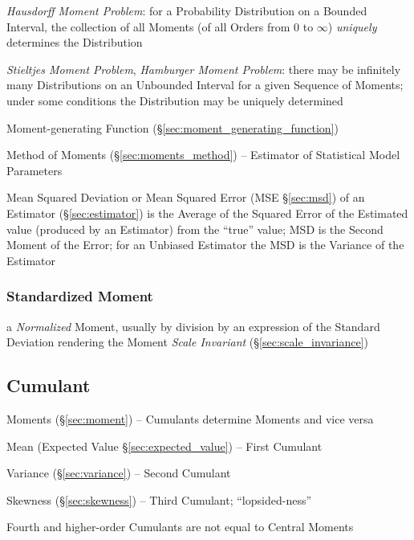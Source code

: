 \emph{Hausdorff Moment Problem}: for a Probability Distribution on a Bounded
Interval, the collection of all Moments (of all Orders from $0$ to $\infty$)
\emph{uniquely} determines the Distribution

\emph{Stieltjes Moment Problem}, \emph{Hamburger Moment Problem}: there may be
infinitely many Distributions on an Unbounded Interval for a given Sequence of
Moments; under some conditions the Distribution may be uniquely determined

\fist Moment-generating Function (\S\ref{sec:moment_generating_function})

\fist Method of Moments (\S\ref{sec:moments_method}) -- Estimator of Statistical
Model Parameters

\fist Mean Squared Deviation or Mean Squared Error (MSE \S\ref{sec:msd}) of an
Estimator (\S\ref{sec:estimator}) is the Average of the Squared Error of the
Estimated value (produced by an Estimator) from the ``true'' value; MSD is
the Second Moment of the Error; for an Unbiased Estimator the MSD is the
Variance of the Estimator



\subsubsection{Standardized Moment}\label{sec:standardized_moment}

a \emph{Normalized} Moment, usually by division by an expression of the Standard
Deviation rendering the Moment \emph{Scale Invariant}
(\S\ref{sec:scale_invariance})



\subsection{Cumulant}\label{sec:cumulant}

\fist Moments (\S\ref{sec:moment}) -- Cumulants determine Moments and vice
versa

Mean (Expected Value \S\ref{sec:expected_value}) -- First Cumulant

Variance (\S\ref{sec:variance}) -- Second Cumulant

Skewness (\S\ref{sec:skewness}) -- Third Cumulant; ``lopsided-ness''

Fourth and higher-order Cumulants are not equal to Central Moments

